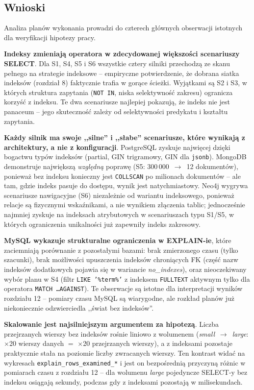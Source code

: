 \subsection{Wnioski}

Analiza planów wykonania prowadzi do czterech głównych obserwacji
istotnych dla weryfikacji hipotezy pracy.

\textbf{Indeksy zmieniają operatora w zdecydowanej większości
scenariuszy SELECT}. Dla S1, S4, S5 i S6 wszystkie cztery silniki
przechodzą ze skanu pełnego na strategie indeksowe -- empiryczne
potwierdzenie, że dobrana siatka indeksów (rozdział 8) faktycznie
trafia w gorące ścieżki. Wyjątkami są S2 i S3, w których struktura
zapytania (\texttt{NOT IN}, niska selektywność zakresu) ogranicza
korzyść z indeksu. Te dwa scenariusze najlepiej pokazują, że indeks
nie jest panaceum -- jego skuteczność zależy od selektywności
predykatu i kształtu zapytania.

\textbf{Każdy silnik ma swoje ,,silne'' i ,,słabe'' scenariusze, które
wynikają z architektury, a nie z konfiguracji}. PostgreSQL zyskuje
najwięcej dzięki bogactwu typów indeksów (partial, GIN trigramowy,
GIN dla \texttt{jsonb}). MongoDB demonstruje największą \emph{względną}
poprawę (S5: 300\,000~$\rightarrow$~12 dokumentów), ponieważ bez indeksu
konieczny jest \texttt{COLLSCAN} po milionach dokumentów -- ale
tam, gdzie indeks pasuje do dostępu, wynik jest natychmiastowy.
Neo4j wygrywa scenariusze nawigacyjne (S6) niezależnie od wariantu
indeksowego, ponieważ relacje są fizycznymi wskaźnikami, a nie
wynikiem złączenia tablic; jednocześnie najmniej zyskuje na
indeksach atrybutowych w scenariuszach typu S1/S5, w których
ograniczenia unikalności już zapewniły indeks zakresowy.

\textbf{MySQL wykazuje strukturalne ograniczenia w EXPLAIN-ie}, które
zaciemniają porównanie z pozostałymi bazami: brak zmierzonego czasu
(tylko szacunki), brak możliwości upuszczenia indeksów chroniących
FK (część nazw indeksów dodatkowych pojawia się w wariancie
\emph{no\_indexes}), oraz nieoczekiwany wybór planu w S4 (filtr
\texttt{LIKE '\%term\%'} z indeksem \texttt{FULLTEXT} aktywnym tylko
dla operatora \texttt{MATCH \dots AGAINST}). Te obserwacje są
istotne dla interpretacji wyników rozdziału 12 -- pomiary czasu MySQL
są wiarygodne, ale rozkład planów już niekoniecznie odzwierciedla
,,świat bez indeksów''.

\textbf{Skalowanie jest najsilniejszym argumentem za hipotezą}. Liczba
przejrzanych wierszy bez indeksów rośnie liniowo z wolumenem
(\emph{small}~$\rightarrow$~\emph{large}: $\times$20 wierszy danych
$=$ $\times$20 przejrzanych wierszy), a z indeksami pozostaje praktycznie
stała na poziomie liczby zwracanych wierszy. Ten kontrast widać na
wykresach \texttt{explain\_rows\_examined\_*} i jest on bezpośrednią
przyczyną różnic w pomiarach czasu z rozdziału 12 -- dla wolumenu
\emph{large} pojedyncze SELECT-y bez indeksu osiągają sekundy,
podczas gdy z indeksami pozostają w milisekundach.
